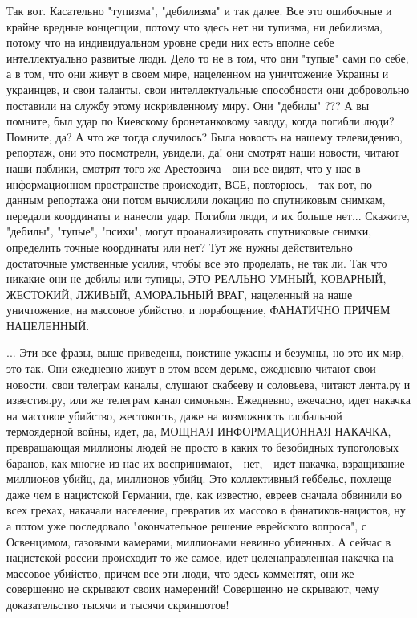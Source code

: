 Так вот. Касательно "тупизма", "дебилизма" и так далее. Все это ошибочные и
крайне вредные концепции, потому что здесь нет ни тупизма, ни дебилизма, потому
что на индивидуальном уровне среди них есть вполне себе интеллектуально
развитые люди.  Дело то не в том, что они "тупые" сами по себе, а в том, что
они живут в своем мире, нацеленном на уничтожение Украины и украинцев, и свои
таланты, свои интеллектуальные способности они добровольно поставили на службу
этому искривленному миру.  Они "дебилы" ??? А вы помните, был удар по Киевскому
бронетанковому заводу, когда погибли люди? Помните, да? А что же тогда
случилось? Была новость на нашему телевидению, репортаж, они это посмотрели,
увидели, да! они смотрят наши новости, читают наши паблики, смотрят того же
Арестовича - они все видят, что у нас в информационном пространстве происходит,
ВСЕ, повторюсь, - так вот, по данным репортажа они потом вычислили локацию по
спутниковым снимкам, передали координаты и нанесли удар. Погибли люди, и их
больше нет...  Скажите, "дебилы", "тупые", "психи", могут проанализировать
спутниковые снимки, определить точные координаты или нет?  Тут же нужны
действительно достаточные умственные усилия, чтобы все это проделать, не так
ли. Так что никакие они не дебилы или тупицы, ЭТО РЕАЛЬНО УМНЫЙ, КОВАРНЫЙ,
ЖЕСТОКИЙ, ЛЖИВЫЙ, АМОРАЛЬНЫЙ ВРАГ, нацеленный на наше уничтожение, на массовое
убийство, и порабощение, ФАНАТИЧНО ПРИЧЕМ НАЦЕЛЕННЫЙ.

... Эти все фразы, выше приведены, поистине ужасны и безумны, но это их мир,
это так.  Они ежедневно живут в этом всем дерьме, ежедневно читают свои
новости, свои телеграм каналы, слушают скабееву и соловьева, читают лента.ру и
известия.ру, или же телеграм канал симоньян.  Ежедневно, ежечасно, идет накачка
на массовое убийство, жестокость, даже на возможность глобальной термоядерной
войны, идет, да, МОЩНАЯ ИНФОРМАЦИОННАЯ НАКАЧКА, превращающая миллионы людей не
просто в каких то безобидных тупоголовых баранов, как многие из нас их
воспринимают, - нет, - идет накачка, взращивание миллионов убийц, да, миллионов
убийц. Это коллективный геббельс, похлеще даже чем в нацистской Германии, где,
как известно, евреев сначала обвинили во всех грехах, накачали население,
превратив их массово в фанатиков-нацистов, ну а потом уже последовало
"окончательное решение еврейского вопроса", с Освенцимом, газовыми камерами,
миллионами невинно убиенных. А сейчас в нацистской россии происходит то же
самое, идет целенаправленная накачка на массовое убийство, причем все эти люди,
что здесь комментят, они же совершенно не скрывают своих намерений! Совершенно
не скрывают, чему доказательство тысячи и тысячи скриншотов!

